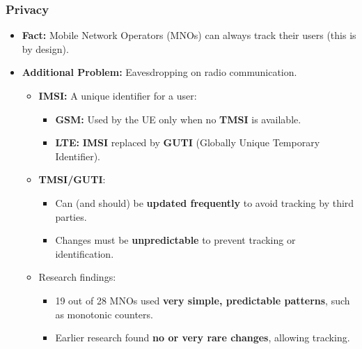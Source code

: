 \subsubsection{Privacy}
\begin{itemize}
    \item \textbf{Fact:} Mobile Network Operators (MNOs) can always track their users (this is by design).
    \item \textbf{Additional Problem:} Eavesdropping on radio communication.
    \begin{itemize}
        \item \textbf{IMSI:} A unique identifier for a user:
        \begin{itemize}
            \item \textbf{GSM:} Used by the UE only when no \textbf{TMSI} is available.
            \item \textbf{LTE:} \textbf{IMSI} replaced by \textbf{GUTI} (Globally Unique Temporary Identifier).
        \end{itemize}
        \item \textbf{TMSI/GUTI}:
        \begin{itemize}
            \item Can (and should) be \textbf{updated frequently} to avoid tracking by third parties.
            \item Changes must be \textbf{unpredictable} to prevent tracking or identification.
        \end{itemize}
        \item Research findings:
        \begin{itemize}
            \item 19 out of 28 MNOs used \textbf{very simple, predictable patterns}, such as monotonic counters.
            \item Earlier research found \textbf{no or very rare changes}, allowing tracking.
        \end{itemize}
    \end{itemize}
\end{itemize}

